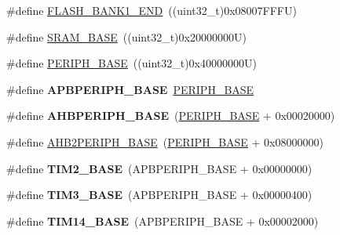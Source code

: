 \begin{DoxyCompactItemize}
\item 
\#define \hyperlink{group___peripheral__memory__map_ga443a2786535d83e32dfdc2b29e379332}{F\+L\+A\+S\+H\+\_\+\+B\+A\+N\+K1\+\_\+\+E\+ND}~((uint32\+\_\+t)0x08007\+F\+F\+F\+U)
\item 
\#define \hyperlink{group___peripheral__memory__map_ga05e8f3d2e5868754a7cd88614955aecc}{S\+R\+A\+M\+\_\+\+B\+A\+SE}~((uint32\+\_\+t)0x20000000\+U)
\item 
\#define \hyperlink{group___peripheral__memory__map_ga9171f49478fa86d932f89e78e73b88b0}{P\+E\+R\+I\+P\+H\+\_\+\+B\+A\+SE}~((uint32\+\_\+t)0x40000000\+U)
\item 
\mbox{\label{group___peripheral__memory__map_gac85f31889eb6a3f651b563bbc7131f91}} 
\#define {\bfseries A\+P\+B\+P\+E\+R\+I\+P\+H\+\_\+\+B\+A\+SE}~\hyperlink{group___peripheral__memory__map_ga9171f49478fa86d932f89e78e73b88b0}{P\+E\+R\+I\+P\+H\+\_\+\+B\+A\+SE}
\item 
\mbox{\label{group___peripheral__memory__map_ga92eb5d49730765d2abd0f5b09548f9f5}} 
\#define {\bfseries A\+H\+B\+P\+E\+R\+I\+P\+H\+\_\+\+B\+A\+SE}~(\hyperlink{group___peripheral__memory__map_ga9171f49478fa86d932f89e78e73b88b0}{P\+E\+R\+I\+P\+H\+\_\+\+B\+A\+SE} + 0x00020000)
\item 
\#define \hyperlink{group___peripheral__memory__map_gaeedaa71d22a1948492365e2cd26cfd46}{A\+H\+B2\+P\+E\+R\+I\+P\+H\+\_\+\+B\+A\+SE}~(\hyperlink{group___peripheral__memory__map_ga9171f49478fa86d932f89e78e73b88b0}{P\+E\+R\+I\+P\+H\+\_\+\+B\+A\+SE} + 0x08000000)
\item 
\mbox{\label{group___peripheral__memory__map_ga00d0fe6ad532ab32f0f81cafca8d3aa5}} 
\#define {\bfseries T\+I\+M2\+\_\+\+B\+A\+SE}~(A\+P\+B\+P\+E\+R\+I\+P\+H\+\_\+\+B\+A\+SE + 0x00000000)
\item 
\mbox{\label{group___peripheral__memory__map_gaf0c34a518f87e1e505cd2332e989564a}} 
\#define {\bfseries T\+I\+M3\+\_\+\+B\+A\+SE}~(A\+P\+B\+P\+E\+R\+I\+P\+H\+\_\+\+B\+A\+SE + 0x00000400)
\item 
\mbox{\label{group___peripheral__memory__map_ga862855347d6e1d92730dfe17ee8e90b8}} 
\#define {\bfseries T\+I\+M14\+\_\+\+B\+A\+SE}~(A\+P\+B\+P\+E\+R\+I\+P\+H\+\_\+\+B\+A\+SE + 0x00002000)

\end{DoxyCompactItemize}
